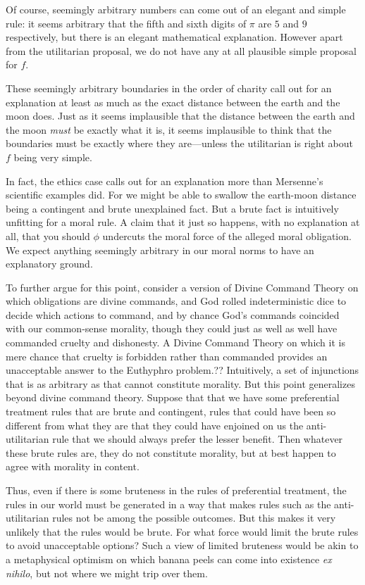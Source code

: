 Of course, seemingly arbitrary numbers can come out of an elegant and simple rule: it seems arbitrary that the fifth and sixth 
digits of $\pi$ are $5$ and $9$ respectively, but there is an elegant mathematical explanation. However apart from the
utilitarian proposal, we do not have any at all plausible simple proposal for $f$.

These seemingly arbitrary boundaries in the order of charity call out for an explanation at least as much as 
the exact distance between the earth and the moon does. Just as it seems implausible that the distance between the earth
and the moon \textit{must} be exactly what it is, it seems implausible to think that the boundaries must be exactly where
they are---unless the utilitarian is right about $f$ being very simple. 

In fact, the ethics case calls out for an explanation more than Mersenne's scientific examples did. For we might 
be able to swallow the earth-moon distance being a contingent and brute unexplained fact. But a brute fact is 
intuitively unfitting for a moral rule. A claim that it just so happens, with no explanation at all, that you should 
$\phi$ undercuts the moral force of the alleged moral obligation. We expect anything seemingly arbitrary in our moral norms to have an explanatory ground.

To further argue for this point, consider a version of Divine Command Theory on which obligations are divine commands, and
God rolled indeterministic
dice to decide which actions to command, and by chance God's commands coincided with our common-sense morality, though they
could just as well as well have commanded cruelty and dishonesty. A Divine Command Theory on which it is mere chance
that cruelty is forbidden rather than commanded provides an unacceptable answer to the Euthyphro problem.??
Intuitively, a set of injunctions that is as arbitrary as that cannot constitute morality. But this point generalizes beyond
divine command theory. Suppose that that we have some preferential treatment rules that are brute and contingent, rules
that could have been so different from what they are that they could have enjoined on us the anti-utilitarian rule that we should always prefer the lesser benefit. Then whatever
these brute rules are, they do not constitute morality, but at best happen to agree with morality in content. 

Thus, even if there is some bruteness in the rules of preferential treatment, the rules in our world must be generated in a way
that makes rules such as the anti-utilitarian rules not be among the possible outcomes. But this makes it very unlikely that
the rules would be brute. For what force would limit the brute rules to avoid unacceptable options? Such a view of limited
bruteness would be akin to a metaphysical optimism on which banana peels can come into existence \textit{ex nihilo}, but not where we might trip
over them.

